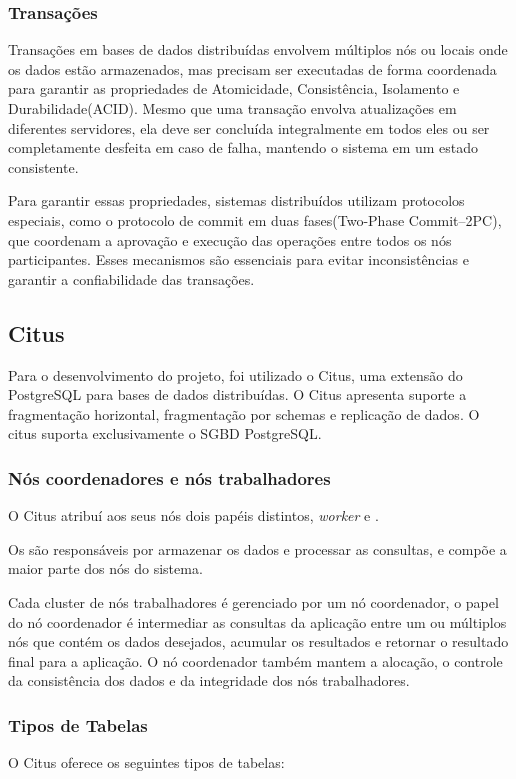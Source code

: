\subsubsection{Transações}
Transações em bases de dados distribuídas envolvem múltiplos nós ou locais onde os dados estão armazenados,
mas precisam ser executadas de forma coordenada para garantir as propriedades de Atomicidade, Consistência, Isolamento e Durabilidade(ACID).
Mesmo que uma transação envolva atualizações em diferentes servidores, 
ela deve ser concluída integralmente em todos eles ou ser completamente desfeita em caso de falha,
mantendo o sistema em um estado consistente.

Para garantir essas propriedades,
sistemas distribuídos utilizam protocolos especiais,
como o protocolo de commit em duas fases(Two-Phase Commit–2PC),
que coordenam a aprovação e execução das operações entre todos os nós participantes. 
Esses mecanismos são essenciais para evitar inconsistências e garantir a confiabilidade das transações.


\subsection{Citus}
Para o desenvolvimento do projeto, foi utilizado o Citus, uma extensão do PostgreSQL para bases de dados distribuídas.
O Citus apresenta suporte a fragmentação horizontal, fragmentação por schemas e
replicação de dados. 
O citus suporta exclusivamente o SGBD PostgreSQL.


\subsubsection{Nós coordenadores e nós trabalhadores}

O  Citus atribuí aos seus nós dois papéis distintos, 
\textit{worker} e .

Os  são responsáveis por armazenar os dados e processar as consultas,
e compõe a maior parte dos nós do sistema.

Cada cluster de nós trabalhadores é gerenciado por um nó coordenador,
o papel do nó coordenador é intermediar as consultas da aplicação entre um ou múltiplos
nós que contém os dados desejados, acumular os resultados e retornar o resultado final para a aplicação.  
O nó coordenador também mantem a alocação, o controle da consistência dos dados 
e da integridade dos nós trabalhadores.

\subsubsection{Tipos de Tabelas}
O Citus oferece os seguintes tipos de tabelas:

